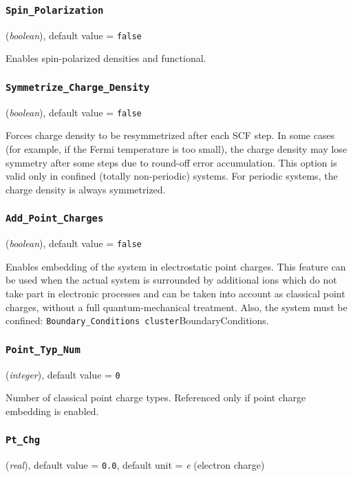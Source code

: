 \documentclass{article}
\begin{document}
\subsubsection{\tt Spin\_Polarization 
\label{SpinPolarization}}
({\it boolean}),
default value = {\tt false }

Enables spin-polarized densities and functional.

\subsubsection{\tt Symmetrize\_Charge\_Density 
\label{SymmetrizeChargeDensity}}
({\it boolean}),
default value = {\tt false }

Forces charge density to be resymmetrized after each SCF step. In some
cases (for example, if the Fermi temperature is too small), the charge
density may lose symmetry after some steps due to round-off error
accumulation. This option is valid only in confined (totally
non-periodic) systems. For periodic systems, the charge density is
always symmetrized.

\subsubsection{\tt Add\_Point\_Charges 
\label{AddPointCharges}}
({\it boolean}),
default value = {\tt false }

Enables embedding of the system in electrostatic point charges. This
feature can be used when the actual system is surrounded by additional
ions which do not take part in electronic processes and can be taken
into account as classical point charges, without a full
quantum-mechanical treatment. Also, the system must be confined:
{\tt Boundary\_Conditions cluster}{BoundaryConditions}.

\subsubsection{\tt Point\_Typ\_Num 
\label{PointTypNum}}
({\it integer}),
default value = {\tt 0}

Number of classical point charge types. Referenced only if point
charge embedding is enabled.

\subsubsection{\tt Pt\_Chg 
\label{PtChg}}
({\it real}),
default value = {\tt 0.0},
default unit = {\it e} (electron charge)
\end{document}
